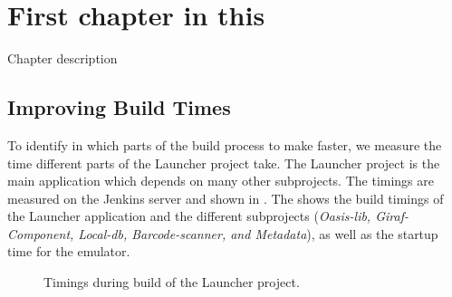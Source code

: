 \chapter{First chapter in this}%
Chapter description

\section{Improving Build Times}

To identify in which parts of the build process to make faster, we measure the time different parts of the Launcher project take. The Launcher project is the main application which depends on many other subprojects. The timings are measured on the Jenkins server and shown in . The shows the build timings of the Launcher application and the different subprojects (\emph{Oasis-lib, Giraf-Component, Local-db, Barcode-scanner, and Metadata}), as well as the startup time for the emulator.

%
\begin{figure}
\caption{Timings during build of the Launcher project.}\label{fig:launcher_build_times}
\end{figure}